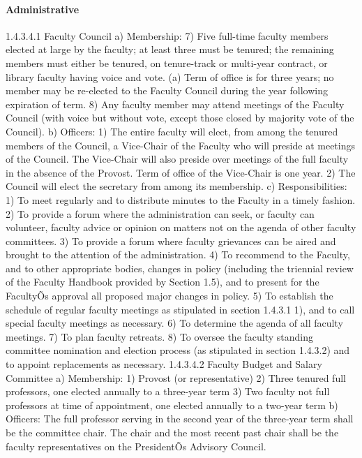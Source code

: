\documentclass[letterpaper, 11pt]{article}
\begin{document}
			\paragraph{Administrative}
				1.4.3.4.1 Faculty Council
				a) Membership:
				7) Five full-time faculty members elected at large by the faculty; at least three must be tenured; the remaining members must either be tenured, on tenure-track or multi-year contract, or library faculty having voice and vote.
				(a) Term of office is for three years; no member may be re-elected to the Faculty Council during the year following expiration of term.
				8) Any faculty member may attend meetings of the Faculty Council (with voice but without vote, except those closed by majority vote of the Council).
				b) Officers:
				1) The entire faculty will elect, from among the tenured members of the Council, a Vice-Chair of the Faculty who will preside at meetings of the Council.  The Vice-Chair will also preside over meetings of the full faculty in the absence of the Provost.  Term of office of the Vice-Chair is one year.
				2) The Council will elect the secretary from among its membership.
				c) Responsibilities:
				1) To meet regularly and to distribute minutes to the Faculty in a timely fashion.
				2) To provide a forum where the administration can seek, or faculty can volunteer, faculty advice or opinion on matters not on the agenda of other faculty committees.
				3) To provide a forum where faculty grievances can be aired and brought to the attention of the administration.
				4) To recommend to the Faculty, and to other appropriate bodies, changes in policy (including the triennial review of the Faculty Handbook provided by Section 1.5), and to present for the FacultyÕs approval all proposed major changes in policy.
				5) To establish the schedule of regular faculty meetings as stipulated in section 1.4.3.1 1), and to call special faculty meetings as necessary.
				6) To determine the agenda of all faculty meetings.
				7) To plan faculty retreats.
				8) To oversee the faculty standing committee nomination and election process (as stipulated in section 1.4.3.2)  and to appoint replacements as necessary.
				1.4.3.4.2   Faculty Budget and Salary Committee
				a) Membership:
				1) Provost (or representative)
				2) Three tenured full professors, one elected annually to a three-year term
				3) Two faculty not full professors at time of appointment, one elected annually to a two-year term
				b) Officers:
				The full professor serving in the second year of the three-year term shall be the committee chair.  The chair and the most recent past chair shall be the faculty representatives on the PresidentÕs Advisory Council.
\end{document}
